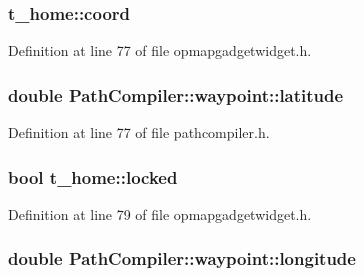 \hypertarget{group___o_p_map_plugin_ga6324b0912396582281b54bc6d5a6f38a}{
\subsubsection[{coord}]{ {\bf t\-\_\-home\-::coord}}}\label{group___o_p_map_plugin_ga6324b0912396582281b54bc6d5a6f38a}


\-Definition at line 77 of file opmapgadgetwidget.\-h.

\hypertarget{group___o_p_map_plugin_ga78f3936ec843f0060648b9503702acd6}{
\subsubsection[{latitude}]{\setlength{\rightskip}{0pt plus 5cm}double {\bf \-Path\-Compiler\-::waypoint\-::latitude}}}\label{group___o_p_map_plugin_ga78f3936ec843f0060648b9503702acd6}


\-Definition at line 77 of file pathcompiler.\-h.

\hypertarget{group___o_p_map_plugin_ga4cc9a1ca8d219f1aa6d823fab6080f02}{
\subsubsection[{locked}]{\setlength{\rightskip}{0pt plus 5cm}bool {\bf t\-\_\-home\-::locked}}}\label{group___o_p_map_plugin_ga4cc9a1ca8d219f1aa6d823fab6080f02}


\-Definition at line 79 of file opmapgadgetwidget.\-h.

\hypertarget{group___o_p_map_plugin_ga698954b834d77d2eb539e287bc6bc9e0}{
\subsubsection[{longitude}]{\setlength{\rightskip}{0pt plus 5cm}double {\bf \-Path\-Compiler\-::waypoint\-::longitude}}}\label{group___o_p_map_plugin_ga698954b834d77d2eb539e287bc6bc9e0}


